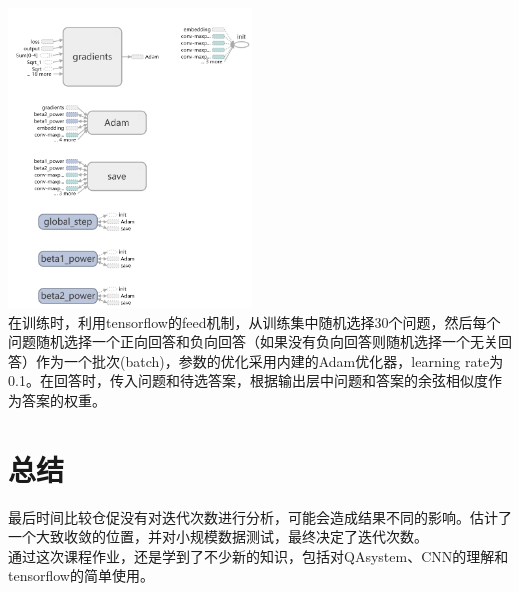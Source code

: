 \documentclass{article}
\begin{document}
\includegraphics[height=300]{2.png}\\

在训练时，利用tensorflow的feed机制，从训练集中随机选择30个问题，然后每个问题随机选择一个正向回答和负向回答（如果没有负向回答则随机选择一个无关回答）作为一个批次(batch)，参数的优化采用内建的Adam优化器\cite{adam}，learning rate为0.1。在回答时，传入问题和待选答案，根据输出层中问题和答案的余弦相似度作为答案的权重。
\section{总结}
最后时间比较仓促没有对迭代次数进行分析，可能会造成结果不同的影响。估计了一个大致收敛的位置，并对小规模数据测试，最终决定了迭代次数。\\

通过这次课程作业，还是学到了不少新的知识，包括对QAsystem、CNN的理解和tensorflow的简单使用。










\newpage


\end{document}
